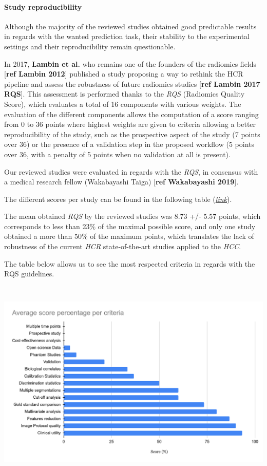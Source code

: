 \documentclass[]{article}
\let\oldparagraph\paragraph
\renewcommand{\paragraph}[1]{\oldparagraph{#1}\mbox{}}
\begin{document}
\paragraph{Study reproducibility}\label{study-reproducibility}

Although the majority of the reviewed studies obtained good predictable
results in regards with the wanted prediction task, their stability to
the experimental settings and their reproducibility remain questionable.

In 2017, \textbf{Lambin et al.} who remains one of the founders of the
radiomics fields {[}\textbf{ref Lambin 2012}{]} published a study
proposing a way to rethink the HCR pipeline and assess the robustness of
future radiomics studies {[}\textbf{ref Lambin 2017 RQS}{]}. This
assessment is performed thanks to the \emph{RQS} (Radiomics Quality
Score), which evaluates a total of 16 components with various weights.
The evaluation of the different components allows the computation of a
score ranging from 0 to 36 points where highest weights are given to
criteria allowing a better reproducibility of the study, such as the
prospective aspect of the study (7 points over 36) or the presence of a
validation step in the proposed workflow (5 points over 36, with a
penalty of 5 points when no validation at all is present).

Our reviewed studies were evaluated in regards with the \emph{RQS}, in
consensus with a medical research fellow (Wakabayashi Taïga)
{[}\textbf{ref Wakabayashi 2019}{]}.

The different scores per study can be found in the following table
(\href{https://docs.google.com/spreadsheets/u/0/d/10EHNALN2_6ZavU7049n6CwTfJO_vd6WBod64u8YNbHg/edit}{\emph{link}}).

The mean obtained \emph{RQS} by the reviewed studies was 8.73 +/- 5.57
points, which corresponds to less than 23\% of the maximal possible
score, and only one study obtained a more than 50\% of the maximum
points, which translates the lack of robustness of the current
\emph{HCR} state-of-the-art studies applied to the \emph{HCC}.

The table below allows us to see the most respected criteria in regards
with the RQS guidelines.

\includegraphics[width=6.26772in,height=3.87500in]{./images/image13.png}
\end{document}
